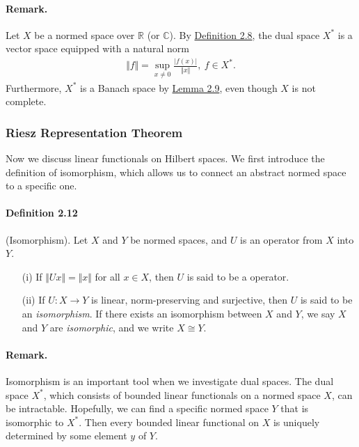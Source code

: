 \documentclass{article}
\begin{document}
\paragraph{Remark.} Let $X$ be a normed space over $\mathbb{R}$ (or $\mathbb{C}$). By \hyperref[def:2.8]{Definition 2.8}, the dual space $X^*$ is a vector space equipped with a natural norm
\begin{align*}
	\Vert f\Vert = \sup_{x\neq 0}\frac{\vert f(x)\vert}{\Vert x\Vert},\ f\in X^*.
\end{align*}
Furthermore, $X^*$ is a Banach space by \hyperref[lemma:2.9]{Lemma 2.9}, even though $X$ is not complete.



\subsubsection{Riesz Representation Theorem}
Now we discuss linear functionals on Hilbert spaces. We first introduce the definition of isomorphism, which allows us to connect an abstract normed space to a specific one. 

\paragraph{Definition 2.12\label{def:2.12}} (Isomorphism). Let $X$ and $Y$ be normed spaces, and $U$ is an operator from $X$ into $Y$.
\begin{itemize}
	\item[(i)] If $\Vert Ux\Vert =\Vert x\Vert$ for all $x\in X$, then $U$ is said to be a  operator.
	\item[(ii)] If $U:X\to Y$ is linear, norm-preserving and surjective, then $U$ is said to be an \textit{isomorphism}. If there exists an isomorphism between $X$ and $Y$, we say $X$ and $Y$ are \textit{isomorphic}, and we write $X\cong Y$.
\end{itemize}

\paragraph{Remark.} Isomorphism is an important tool when we investigate dual spaces. The dual space $X^*$, which consists of bounded linear functionals on a normed space $X$, can be intractable. Hopefully, we can find a specific normed space $Y$ that is isomorphic to $X^*$. Then every bounded linear functional on $X$ is uniquely determined by some element $y$ of $Y$.
\end{document}
